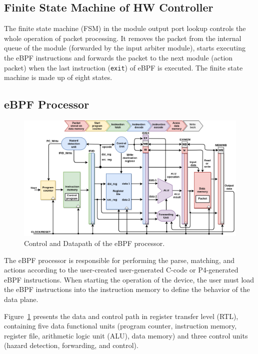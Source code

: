 \subsection{Finite State Machine of HW Controller}

The finite state machine (FSM) in the module output port lookup controls the whole operation of packet processing. It removes the packet from the internal queue of the module (forwarded by the input arbiter module), starts executing the eBPF instructions and forwards the packet to the next module (action packet) when the last instruction (\texttt{exit}) of eBPF is executed. The finite state machine is made up of eight states.

\subsection{eBPF Processor}

\begin{figure}[hbt]
\centering
\includegraphics[width=.9\textwidth]{figures/06_fig02.png}
\caption{Control and Datapath of the eBPF processor.}
\label{fig:06_fig02}
\end{figure}


The eBPF processor is responsible for performing the parse, matching, and actions according to the user-created user-generated C-code or P4-generated eBPF instructions. When starting the operation of the device, the user must load the eBPF instructions into the instruction memory to define  the behavior of the data plane.

Figure~\ref{fig:06_fig02} presents the data and control path in register transfer level (RTL), containing five data functional units (program counter, instruction memory, register file, arithmetic logic unit (ALU), data memory) and three control units (hazard detection, forwarding, and control).

